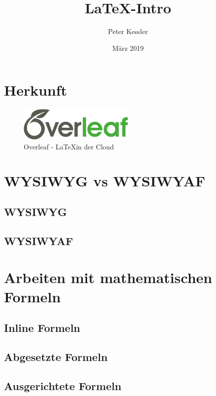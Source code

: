 \documentclass[12pt, a4paper]{article}
\title{\LaTeX-Intro}          %
\author{Peter Kessler}        %
\date{März 2019}              %
\begin{document}
\maketitle

\pagebreak
\tableofcontents



\pagebreak 
\section{Herkunft}


\begin{figure}[h!]
\centering
  \includegraphics[width=0.5\textwidth]{./Bilder/overleaf.png}
  \caption{Overleaf - \LaTeX in der Cloud}
\end{figure}



\pagebreak
\section{WYSIWYG vs WYSIWYAF}

\subsection{WYSIWYG}


\subsection{WYSIWYAF}




\pagebreak
\section{Arbeiten mit mathematischen Formeln}


\subsection{Inline Formeln}


\subsection{Abgesetzte Formeln}


\subsection{Ausgerichtete Formeln}

\end{document}
